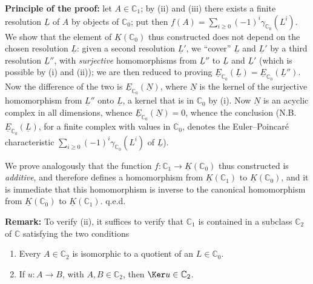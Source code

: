 \textbf{Principle of the proof:} let $A\in\mathbb{C}_1$; by (ii) and (iii) there exists a finite resolution $\underline{L}$ of $A$ by objects of $\mathbb{C}_0$; put
%
then $f(A)=\sum_{i\geq 0}(-1)^i\gamma_{\mathbb{C}_0}(L^i)$.
We show that the element of $\underline{K}(\mathbb{C}_0)$ thus constructed does not depend on the chosen resolution $\underline{L}$: given a second resolution $\underline{L}'$, we ``cover'' $\underline{L}$ and $\underline{L}'$ by a third resolution $\underline{L}''$, with \emph{surjective} homomorphisms from $\underline{L}''$ to $\underline{L}$ and $\underline{L}'$ (which is possible by (i) and (ii)); we are then reduced to proving $\underline{E}_{\mathbb{C}_0}(\underline{L})=\underline{E}_{\mathbb{C}_0}(\underline{L}'')$. Now the difference of the two is $\underline{E}_{\mathbb{C}_0}(\underline{N})$, where $\underline{N}$ is the kernel of the surjective homomorphism from $\underline{L}''$ onto $\underline{L}$, a kernel that is in $\mathbb{C}_0$ by (i). Now $\underline{N}$ is an acyclic complex in all dimensions, whence $\underline{E}_{\mathbb{C}_0}(\underline{N})=0$, whence the conclusion (N.B. $\underline{E}_{\mathbb{C}_0}(\underline{L})$, for a finite complex with values in $\mathbb{C}_0$, denotes the Euler--Poincaré characteristic $\sum_{i\geq0}(-1)^i\gamma_{\mathbb{C}_0}(L^i)$ of $\underline{L}$).

We prove analogously that the function $f:\mathbb{C}_1\longrightarrow\underline{K}(\mathbb{C}_0)$ thus constructed is \emph{additive}, and therefore defines a homomorphism from $\underline{K}(\mathbb{C}_1)$ to $\underline{K}(\mathbb{C}_0)$, and it is immediate that this homomorphism is inverse to the canonical homomorphism from $\underline{K}(\mathbb{C}_0)$ to $\underline{K}(\mathbb{C}_1)$. q.e.d.

\textbf{Remark:} To verify (ii), it suffices to verify that $\mathbb{C}_1$ is contained in a subclass $\mathbb{C}_2$ of $\mathbb{C}$ satisfying the two conditions
\begin{enumerate}[label=(ii \alph*)]
\item Every $A\in\mathbb{C}_2$ is isomorphic to a quotient of an $L\in\mathbb{C}_0$.
\item If $u:A\to B$, with $A,B\in\mathbb{C}_2$, then $\Ker u\in\mathbb{C}_2$.
\end{enumerate}

